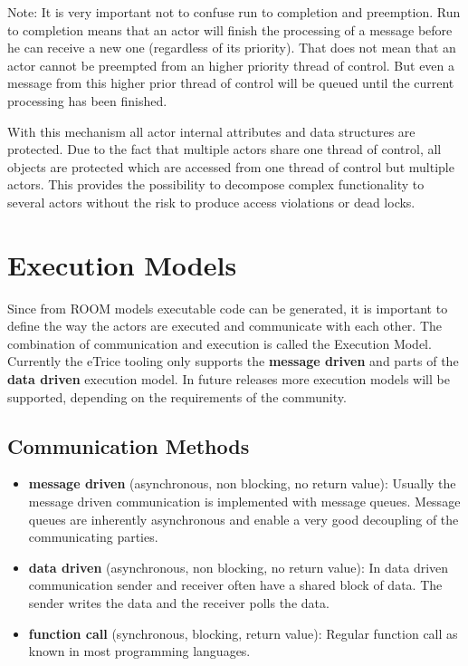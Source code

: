 Note: It is very important not to confuse run to completion and preemption. Run to completion means that 
an actor will finish the processing of a message before he can receive a new one (regardless of its 
priority). That does not mean that an actor cannot be preempted from an higher priority thread of control. 
But even a message from this higher prior thread of control will be queued until the current processing 
has been finished. 

With this mechanism all actor internal attributes and data structures are protected. Due to the fact that 
multiple actors share one thread of control, all objects are protected which are accessed from one thread 
of control but multiple actors. This provides the possibility to decompose complex functionality to 
several actors without the risk to produce access violations or dead locks.

\section{Execution Models}

Since from ROOM models executable code can be generated, it is important to define the way the actors are 
executed and communicate with each other. The combination of communication and execution is called the 
Execution Model.
Currently the eTrice tooling only supports the \textbf{message driven} and parts of the \textbf{data 
driven} execution model. In future releases more execution models will be supported, depending on the 
requirements of the community.

\subsection{Communication Methods}

\begin{itemize}
\item \textbf{message driven} (asynchronous, non blocking, no return value): Usually the message driven 
communication is implemented with message queues. Message queues are inherently asynchronous and enable a 
very good decoupling of the communicating parties.
\item \textbf{data driven} (asynchronous, non blocking, no return value): In data driven communication 
sender and receiver often have a shared block of data. The sender writes the data and the receiver polls 
the data.
\item \textbf{function call} (synchronous, blocking, return value): Regular function call as known in most 
programming languages.
\end{itemize}

